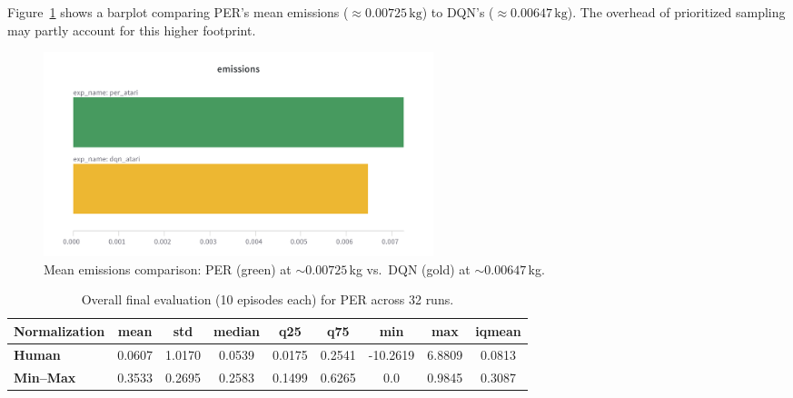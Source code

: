 Figure~\ref{fig:per_vs_dqn_emissions} shows a barplot comparing PER’s mean emissions (\(\approx 0.00725\,\mathrm{kg}\)) to DQN’s (\(\approx0.00647\,\mathrm{kg}\)). The overhead of prioritized sampling may partly account for this higher footprint.

\begin{figure}
	\centering
	\includegraphics[width=0.55\textwidth]{figures/per/emissions_dqn_per.png}
	\caption{Mean emissions comparison: PER (green) at $\sim0.00725$\,kg vs.\ DQN (gold) at $\sim0.00647$\,kg.}
	\label{fig:per_vs_dqn_emissions}
\end{figure}

\begin{table}
	\caption{Overall final evaluation (10 episodes each) for PER across 32 runs.}
	\label{tab:per_eval_overall}
	\centering
	\begin{tabular}{lcccccccc}
		\toprule
		\textbf{Normalization} & \textbf{mean} & \textbf{std} & \textbf{median} & 
		\textbf{q25} & \textbf{q75} & \textbf{min} & \textbf{max} & \textbf{iqmean} \\
		\midrule
		\textbf{Human}   & 0.0607 & 1.0170 & 0.0539 & 0.0175 & 0.2541 & -10.2619 & 6.8809 & 0.0813 \\
		\textbf{Min--Max}& 0.3533 & 0.2695 & 0.2583 & 0.1499 & 0.6265 & 0.0 & 0.9845 & 0.3087 \\
		\bottomrule
	\end{tabular}
\end{table}

